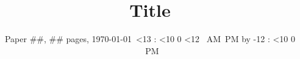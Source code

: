 \documentclass{sig-alternate-10pt}
\def\drafttime{\ifnum \hour<13 \number\hour:%
                      \ifnum \minute<10 0\fi
                      \number\minute
                      \ifnum \hour<12 \ AM\else \ PM\fi
         \else \advance \hour by -12 \number\hour:%
                      \ifnum \minute<10 0\fi
                      \number\minute \ PM\fi}
\def\timestamp{\today \ \drafttime}
\begin{document}

\title{Title}
\author{Paper \#\#, \#\# pages, \timestamp}

\maketitle
\setlength{\textfloatsep}{1pt}

%

%
%
%
%
%
%
%
%
%
\clearpage


%
\end{document}
